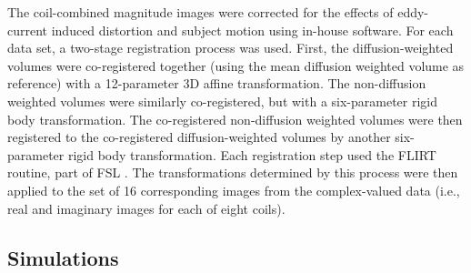 \documentclass[authoryear,preprint,12pt]{elsarticle}
\begin{document}
The coil-combined magnitude images were corrected for the effects of
eddy-current induced distortion and subject motion using in-house
software.  For each data set, a two-stage registration process was
used.  First, the diffusion-weighted volumes were co-registered
together (using the mean diffusion weighted volume as reference) with
a 12-parameter 3D affine transformation.  The non-diffusion weighted
volumes were similarly co-registered, but with a six-parameter rigid
body transformation.  The co-registered non-diffusion weighted volumes
were then registered to the co-registered diffusion-weighted volumes
by another six-parameter rigid body transformation.  Each registration
step used the FLIRT routine, part of FSL
\citep{jen-smi:global,smi-etal:FSL}.  The transformations determined
by this process were then applied to the set of 16 corresponding
images from the complex-valued data (i.e., real and imaginary images
for each of eight coils).

\subsection{Simulations}
\label{methods-simulations}
\end{document}
